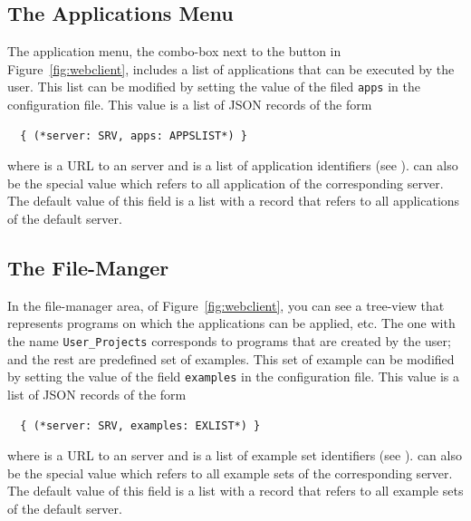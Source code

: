 \subsection{The Applications Menu}
\label{ch:clients:web:appsmenu}

The application menu, the combo-box next to the \applybutton button in
Figure~\ref{fig:webclient}, includes a list of applications that can
be executed by the user. This list can be modified by setting the
value of the filed \texttt{apps} in the configuration file. This value
is a list of JSON records of the form

\bigskip
\begin{lstlisting}
  { (*server: SRV, apps: APPSLIST*) }
\end{lstlisting}
 
\bigskip
\noindent  
where  is a URL to an \ei server and  is a list
of application identifiers (see ).
%
 can also be the special value  which refers
to all application of the corresponding server.
%
The default value of this field is a list with a record that refers to
all applications of the default server.

\subsection{The File-Manger}
\label{ch:clients:web:filemanager}

In the file-manager area, of Figure~\ref{fig:webclient}, you can see a
tree-view that represents programs on which the applications can be
applied, etc. The one with the name \texttt{User\_Projects}
corresponds to programs that are created by the user; and the rest are
predefined set of examples. This set of example can be modified by
setting the value of the field \texttt{examples} in the configuration
file.  This value is a list of JSON records of the form

\bigskip
\begin{lstlisting}
  { (*server: SRV, examples: EXLIST*) } 
\end{lstlisting}

\bigskip
\noindent
where  is a URL to an \ei server and  is a list
of example set identifiers (see
).  can also be the special
value  which refers to all example sets of the corresponding
server. The default value of this field is a list with a record that
refers to all example sets of the default server.

